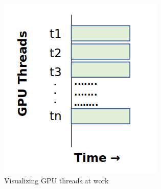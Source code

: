 \documentclass{article}
\begin{document}
\begin{figure}[H]
\hfill\includegraphics[scale=0.72]{Graphics/gpu.PNG}\hspace*{\fill}
\caption{Visualizing GPU threads at work}
\end{figure}
\end{document}
